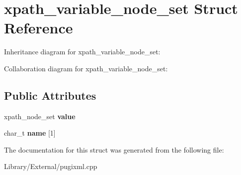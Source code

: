 \hypertarget{structxpath__variable__node__set}{}\section{xpath\+\_\+variable\+\_\+node\+\_\+set Struct Reference}
\label{structxpath__variable__node__set}


Inheritance diagram for xpath\+\_\+variable\+\_\+node\+\_\+set\+:


Collaboration diagram for xpath\+\_\+variable\+\_\+node\+\_\+set\+:
\subsection*{Public Attributes}
\begin{DoxyCompactItemize}
\item 
\hypertarget{structxpath__variable__node__set_a830ac0dbcaf5f8ff3373d10273e72bf4}{}xpath\+\_\+node\+\_\+set {\bfseries value}\label{structxpath__variable__node__set_a830ac0dbcaf5f8ff3373d10273e72bf4}

\item 
\hypertarget{structxpath__variable__node__set_a9a6a40cea40764364adb3ddba2e7a2ff}{}char\+\_\+t {\bfseries name} \mbox{[}1\mbox{]}\label{structxpath__variable__node__set_a9a6a40cea40764364adb3ddba2e7a2ff}

\end{DoxyCompactItemize}


The documentation for this struct was generated from the following file\+:\begin{DoxyCompactItemize}
\item 
Library/\+External/pugixml.\+cpp\end{DoxyCompactItemize}
